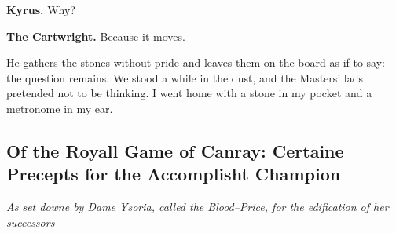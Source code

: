 \documentclass[11pt]{article}
\begin{document}
\noindent\textbf{Kyrus.} Why?

\noindent\textbf{The Cartwright.} Because it moves.

\medskip
He gathers the stones without pride and leaves them on the board as if to say: the question remains. We stood a while in the dust, and the Masters’ lads pretended not to be thinking. I went home with a stone in my pocket and a metronome in my ear.
\clearpage

\subsection{Of the Royall Game of Canray: Certaine Precepts for the Accomplisht Champion}
\noindent\textit{As set downe by Dame Ysoria, called the Blood--Price, for the edification of her successors}
\end{document}
